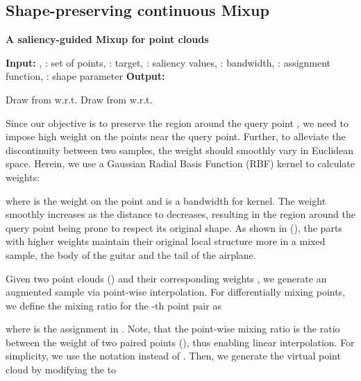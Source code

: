 \documentclass{article}
\begin{document}
\subsection{Shape-preserving continuous Mixup}
\label{sec:method.2}
\begin{algorithm}[t]
\caption{{\label{algo:1}} \textbf{A saliency-guided Mixup for point clouds}} 
\textbf{Input:} , \newline
 : set of points,  : target,  : saliency values,  : bandwidth,  : assignment function,  : shape parameter\newline
\textbf{Output:} \newline

\begin{algorithmic}[1]
\State Draw  from  w.r.t.  
\State Draw  from  w.r.t.  
    \State  {}
    \State   {}
    \State  {}
\EndFor
\State 
\State 
\State \Return 
\end{algorithmic}
\vspace{10pt}
\end{algorithm}
 Since our objective is to preserve the region around the query point , we need to impose high weight on the points near the query point. Further, to alleviate the discontinuity between two samples, the weight should smoothly vary in Euclidean space. Herein, we use a Gaussian Radial Basis Function (RBF) kernel to calculate weights: 

where  is the weight on the point  and  is a bandwidth for kernel. 
The weight  smoothly increases as the distance to  decreases, resulting in the region around the query point being prone to respect its original shape.
As shown in (), the parts with higher weights maintain their original local structure more in a mixed sample, \eg the body of the guitar and the tail of the airplane.

Given two point clouds () and their corresponding weights , we generate an augmented sample via point-wise interpolation. 
For differentially mixing points, we define the mixing ratio for the -th point pair as

where  is the assignment in . Note, that the point-wise mixing ratio  is the ratio between the weight of two paired points (\ie ), thus enabling linear interpolation. For simplicity, we use the notation  instead of .
Then, we generate the virtual point cloud by modifying the  to
\end{document}
